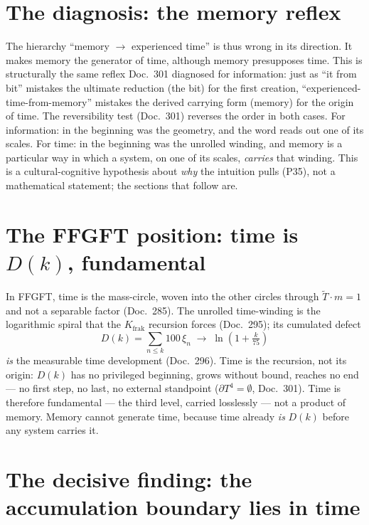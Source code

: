 \section{The diagnosis: the memory reflex}

The hierarchy \enquote{memory $\to$ experienced time} is thus wrong in its direction. It
makes memory the generator of time, although memory presupposes time. This is structurally
the same reflex Doc.~301 diagnosed for information: just as \enquote{it from bit} mistakes
the ultimate reduction (the bit) for the first creation, \enquote{experienced-time-from-memory}
mistakes the derived carrying form (memory) for the origin of time. The reversibility test
(Doc.~301) reverses the order in both cases. For information: in the beginning was the
geometry, and the word reads out one of its scales. For time: in the beginning was the
unrolled winding, and memory is a particular way in which a system, on one of its scales,
\emph{carries} that winding. This is a cultural-cognitive hypothesis about \emph{why} the
intuition pulls (P35), not a mathematical statement; the sections that follow are.

\section{The FFGFT position: time is $D(k)$, fundamental}

In FFGFT, time is the mass-circle, woven into the other circles through
$\tilde{T}\cdot m = 1$ and not a separable factor (Doc.~285). The unrolled time-winding is
the logarithmic spiral that the $K_{\text{frak}}$ recursion forces (Doc.~295); its cumulated
defect
\begin{equation}
D(k) = \sum_{n\le k} 100\,\xi_n \;\to\; \ln\!\left(1 + \tfrac{k}{75}\right)
\end{equation}
\emph{is} the measurable time development (Doc.~296). Time is the recursion, not its origin:
$D(k)$ has no privileged beginning, grows without bound, reaches no end --- no first step, no
last, no external standpoint ($\partial T^4 = \emptyset$, Doc.~301). Time is therefore
fundamental --- the third level, carried losslessly --- not a product of memory. Memory
cannot generate time, because time already \emph{is} $D(k)$ before any system carries it.

\section{The decisive finding: the accumulation boundary lies in time}

